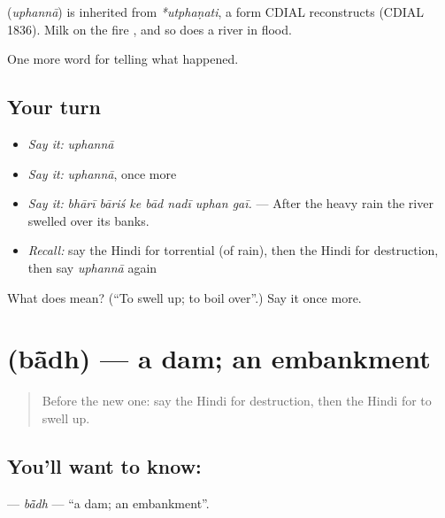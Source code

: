 \begin{cousinweb}
\textbf{} (\emph{uphannā}) is inherited from \emph{*utphaṇati}, a form CDIAL reconstructs (CDIAL 1836). Milk on the fire \textbf{ }, and so does a river in flood.
\end{cousinweb}

\begin{grammarlens}[title={What you've built}]
One more word for telling what happened.
\end{grammarlens}

\subsection*{Your turn}
\begin{itemize}
\raggedright
  \item \emph{Say it:} \emph{uphannā}
  \item \emph{Say it:} \emph{uphannā}, once more
  \item \emph{Say it:} \emph{bhārī bāriś ke bād nadī uphan gaī.} — After the heavy rain the river swelled over its banks.
  \item \emph{Recall:} say the Hindi for torrential (of rain), then the Hindi for destruction, then say \emph{uphannā} again
\end{itemize}

\begin{tcolorbox}[breakable,colback=teal!4,colframe=teal!35!black,title={Before you move on}]
What does  mean? (\textquotedblleft{}To swell up; to boil over\textquotedblright{}.) Say it once more.
\end{tcolorbox}
\section[\texorpdfstring{\hi{बाँध} (bā̃dh)}{बाँध (bā̃dh)}]{ (bā̃dh) — a dam; an embankment}

\label{lesson:HI-C305-badh}



\begin{quote}
Before the new one: say the Hindi for destruction, then the Hindi for to swell up.
\end{quote}

\subsection*{You'll want to know: }
\textbf{} — \emph{bā̃dh} — \textquotedblleft{}a dam; an embankment\textquotedblright{}.

